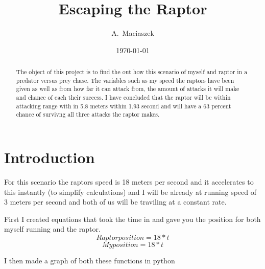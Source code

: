 \documentclass[twocolumn]{revtex4}
\begin{document}


\title{
Escaping the Raptor
}

\author{A.~Maciaszek}

\date{\today}

\begin{abstract}
    The object of this project is to find the out how this scenario of myself and raptor in a predator versus prey chase. The variables such as my speed the raptors have been given as well as from how far it can attack from, the amount of attacks it will make and chance of each their success. I have concluded that the raptor will be within attacking range with in 5.8 meters within 1.93 second and will have a 63 percent chance of survivng all three attacks the raptor makes.
    
\end{abstract}

\maketitle

\section{Introduction}
For this scenario the raptors speed is 18 meters per second and it accelerates to this instantly (to simplify calculations) and I will be already at running speed of 3 meters per second and both of us will be traviling at a constant rate.

First I created equations that took the time in and gave you the position for both myself running and the raptor.
$$Raptorposition= 18*t$$ $$My  position= 18*t$$
    
I then made a graph of both these functions in python
    
\end{document}
